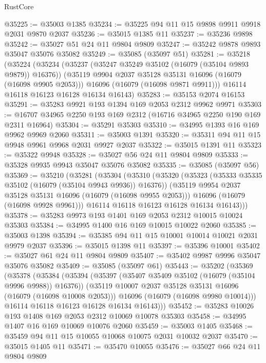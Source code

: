 \begin{lexlean}{RustCore}
\begin{coremodule}
@35225 := @35003 @1385
@35234 := @35225 @94 @11 @15 @9898 @9911 @9918 @2031 @9870 @2037
@35236 := @35015 @1385 @11
@35237 := @35236 @9898
@35242 := @35027 @51 @24 @11 @9804 @9809
@35247 := @35242 @9878 @9893 @35047 @35076 @35082
@35249 := @35085 (@35097 @51)
@35281 := @35218
    (@35224
      (@35234
        (@35237 (@35247 @35249 @35102 (@16079 (@35104 @9893 @9879)) @16376))
        (@35119 @9904 @2037 @35128 @35131 @16096 (@16079 (@16098 @9905 @2053)))
        @16096
        (@16079 (@16098 @9871 @9911)))
      @16114
      @16118
      @16123
      @16128
      @16134
      @16143)
@35283 := @35153 @2074 @16153
@35291 := @35283 @9921 @193 @1394 @169 @2053 @2312 @9962 @9971
@35303 := @16707 @34965 @2250 @193 @169 @2312 (@16716 @34965 @2250 @190 @169 @2311 @16964)
@35304 := @35291 @35303
@35310 := @34995 @1393 @16 @169 @9962 @9969 @2060
@35311 := @35003 @1391
@35320 := @35311 @94 @11 @15 @9948 @9961 @9968 @2031 @9927 @2037
@35322 := @35015 @1391 @11
@35323 := @35322 @9948
@35328 := @35027 @56 @24 @11 @9804 @9809
@35333 := @35328 @9935 @9943 @35047 @35076 @35082
@35335 := @35085 (@35097 @56)
@35369 := @35210
    (@35281
      (@35304
        (@35310
          (@35320
            (@35323 (@35333 @35335 @35102 (@16079 (@35104 @9943 @9936)) @16376))
            (@35119 @9954 @2037 @35128 @35131 @16096 (@16079 (@16098 @9955 @2053)))
            @16096
            (@16079 (@16098 @9928 @9961)))
          @16114
          @16118
          @16123
          @16128
          @16134
          @16143)))
@35378 := @35283 @9973 @193 @1401 @169 @2053 @2312 @10015 @10024 @35303
@35384 := @34995 @1400 @16 @169 @10015 @10022 @2060
@35385 := @35003 @1398
@35394 := @35385 @94 @11 @15 @10001 @10014 @10021 @2031 @9979 @2037
@35396 := @35015 @1398 @11
@35397 := @35396 @10001
@35402 := @35027 @61 @24 @11 @9804 @9809
@35407 := @35402 @9987 @9996 @35047 @35076 @35082
@35409 := @35085 (@35097 @61)
@35443 := @35202
    (@35369
      (@35378
        (@35384
          (@35394
            (@35397 (@35407 @35409 @35102 (@16079 (@35104 @9996 @9988)) @16376))
            (@35119 @10007 @2037 @35128 @35131 @16096 (@16079 (@16098 @10008 @2053)))
            @16096
            (@16079 (@16098 @9980 @10014)))
          @16114
          @16118
          @16123
          @16128
          @16134
          @16143)))
@35452 := @35283 @10026 @193 @1408 @169 @2053 @2312 @10069 @10078 @35303
@35458 := @34995 @1407 @16 @169 @10069 @10076 @2060
@35459 := @35003 @1405
@35468 := @35459 @94 @11 @15 @10055 @10068 @10075 @2031 @10032 @2037
@35470 := @35015 @1405 @11
@35471 := @35470 @10055
@35476 := @35027 @66 @24 @11 @9804 @9809

\end{coremodule}
\end{lexlean}
